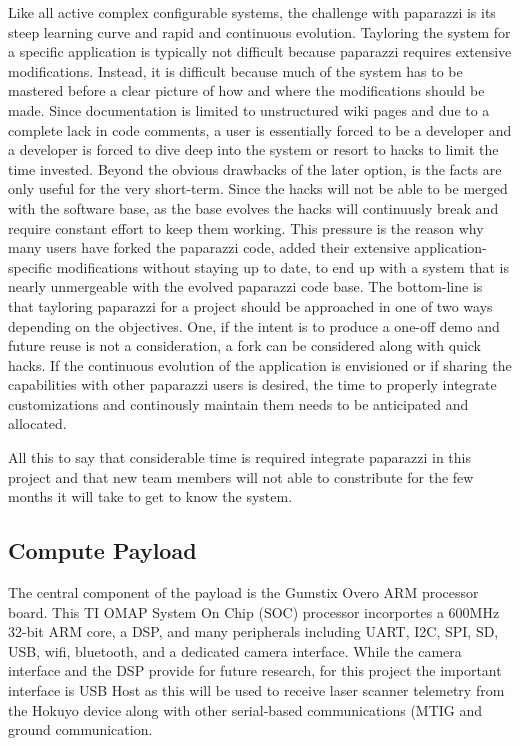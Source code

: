 \documentclass[a4paper,11pt]{report}
\begin{document}
Like all active complex configurable systems, the challenge with paparazzi is its steep learning curve and rapid and continuous evolution. Tayloring the system for a specific application is typically not difficult because paparazzi requires extensive modifications. Instead, it is difficult because much of the system has to be mastered before a clear picture of how and where the modifications should be made. Since documentation is limited to unstructured wiki pages and due to a complete lack in code comments, a user is essentially forced to be a developer and a developer is forced to dive deep into the system or resort to hacks to limit the time invested. Beyond the obvious drawbacks of the later option, is the facts are only useful for the very short-term. Since the hacks will not be able to be merged with the software base, as the base evolves the hacks will continuusly break and require constant effort to keep them working. This pressure is the reason why many users have forked the paparazzi code, added their extensive application-specific modifications without staying up to date, to end up with a system that is nearly unmergeable with the evolved paparazzi code base. The bottom-line is that tayloring paparazzi for a project should be approached in one of two ways depending on the objectives. One, if the intent is to produce a one-off demo and future reuse is not a consideration, a fork can be considered along with quick hacks. If the continuous evolution of the application is envisioned or if sharing the capabilities with other paparazzi users is desired, the time to properly integrate customizations and continously maintain them needs to be anticipated and allocated.

All this to say that considerable time is required integrate paparazzi in this project and that new team members will not able to constribute for the few months it will take to get to know the system.

\subsection{Compute Payload}

The central component of the payload is the Gumstix Overo ARM processor board. This TI OMAP System On Chip (SOC) processor incorportes a 600MHz 32-bit ARM core, a DSP, and many peripherals including UART, I2C, SPI, SD, USB, wifi, bluetooth, and a dedicated camera interface. While the camera interface and the DSP provide for future research, for this project the important interface is USB Host as this will be used to receive laser scanner telemetry from the Hokuyo device along with other serial-based communications (MTIG and ground communication.
\end{document}
